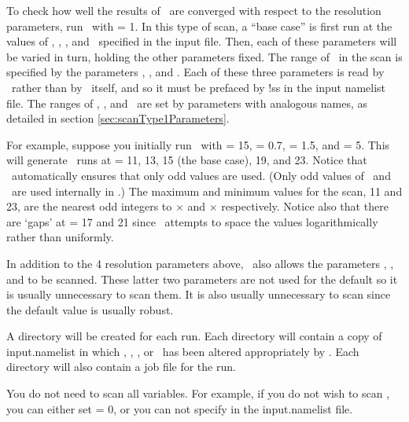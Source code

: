 To check how well the results of \sfincs~are converged with respect to the resolution
parameters, run \sfincsScan~with  = 1.
In this type of scan, a ``base case'' is first run at the
values of \Ntheta, \Nzeta, \Nxi, and \Nx~specified in the input file.
Then, each of these parameters will be varied in turn, holding the other parameters fixed.
The range of \Ntheta~in the scan is specified by the parameters ,
, and . 
Each of these three parameters is read by \sfincsScan~rather than by \sfincs~itself,
and so it must be prefaced by {\ttfamily !ss} in the input namelist file.
The ranges of \Nzeta, \Nxi, and \Nx~are set by parameters with analogous names,
as detailed in section \ref{sec:scanType1Parameters}.

For example, suppose you initially run \sfincsScan~with \Ntheta = 15, 
 = 0.7,  = 1.5, and 
 = 5.
This will generate \sfincs~runs at \Ntheta = 11, 13, 15 (the base case), 19, and 23.
Notice that \sfincsScan~automatically ensures that only odd values are used.
(Only odd values of \Ntheta~and \Nzeta~are used internally in \sfincs.)
The maximum and minimum values for the scan, 11 and 23, are the nearest odd integers
to \Ntheta$\times$ and \Ntheta$\times$ respectively.
Notice also that there are `gaps' at  \Ntheta = 17 and 21 since \sfincsScan~attempts to space the values
logarithmically rather than uniformly.

In addition to the 4 resolution parameters above, \sfincsScan~also allows the parameters
, , and 
to be scanned.  These latter two parameters are not used for the default 
so it is usually unnecessary to scan them.  It is also usually unnecessary to scan 
since the default value is usually robust.

A directory will be created for each run.  Each directory will contain
a copy of {\ttfamily input.namelist} in which \Ntheta, \Nzeta, \Nx, or \Nxi~has been
altered appropriately by \sfincsScan. Each directory will also contain a job file for the run.

You do not need to scan all variables. For example, if you do not wish to scan \Nx,
you can either set  = 0, or you can not specify
 in the {\ttfamily input.namelist} file.

